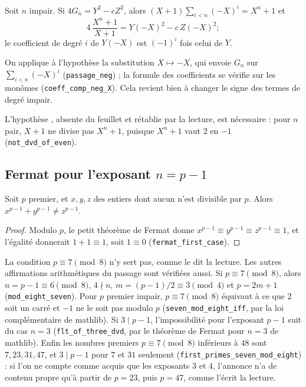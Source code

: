 \begin{enonce}
Soit $n$ impair. Si $4G_n = Y^2 - cZ^2$, alors $(X+1)\sum_{i<n}(-X)^i = X^n + 1$ et
\[ 4\,\frac{X^n + 1}{X + 1} = Y(-X)^2 - c\,Z(-X)^2 ; \]
le coefficient de degré $i$ de $Y(-X)$ est $(-1)^i$ fois celui de $Y$.
\end{enonce}

On applique à l'hypothèse la substitution $X \mapsto -X$, qui envoie $G_n$ sur $\sum_{i<n}(-X)^i$ (\texttt{passage\_neg}) ; la formule des coefficients se vérifie sur les monômes (\texttt{coeff\_comp\_neg\_X}). Cela revient bien à changer le signe des termes de degré impair.

\begin{remarque}
L'hypothèse , absente du feuillet et rétablie par la lecture, est nécessaire : pour $n$ pair, $X + 1$ ne divise pas $X^n + 1$, puisque $X^n + 1$ vaut $2$ en $-1$ (\texttt{not\_dvd\_of\_even}).
\end{remarque}

\subsection*{Fermat pour l'exposant $n = p - 1$}

\begin{enonce}
Soit $p$ premier, et $x, y, z$ des entiers dont aucun n'est divisible par $p$. Alors $x^{p-1} + y^{p-1} \neq z^{p-1}$.
\end{enonce}

\begin{proof}
Modulo $p$, le petit théorème de Fermat donne $x^{p-1} \equiv y^{p-1} \equiv z^{p-1} \equiv 1$, et l'égalité donnerait $1 + 1 \equiv 1$, soit $1 \equiv 0$ (\texttt{fermat\_first\_case}).
\end{proof}

La condition $p \equiv 7 \pmod 8$ n'y sert pas, comme le dit la lecture. Les autres affirmations arithmétiques du passage sont vérifiées aussi. Si $p \equiv 7 \pmod 8$, alors $n = p - 1 \equiv 6 \pmod 8$, $4 \nmid n$, $m = (p-1)/2 \equiv 3 \pmod 4$ et $p = 2m + 1$ (\texttt{mod\_eight\_seven}). Pour $p$ premier impair, $p \equiv 7 \pmod 8$ équivaut à ce que $2$ soit un carré et $-1$ ne le soit pas modulo $p$ (\texttt{seven\_mod\_eight\_iff}, par la loi complémentaire de mathlib). Si $3 \mid p - 1$, l'impossibilité pour l'exposant $p - 1$ suit du cas $n = 3$ (\texttt{flt\_of\_three\_dvd}, par le théorème de Fermat pour $n = 3$ de mathlib). Enfin les nombres premiers $p \equiv 7 \pmod 8$ inférieurs à $48$ sont $7, 23, 31, 47$, et $3 \mid p - 1$ pour $7$ et $31$ seulement (\texttt{first\_primes\_seven\_mod\_eight}) : si l'on ne compte comme acquis que les exposants $3$ et $4$, l'annonce n'a de contenu propre qu'à partir de $p = 23$, puis $p = 47$, comme l'écrit la lecture.

